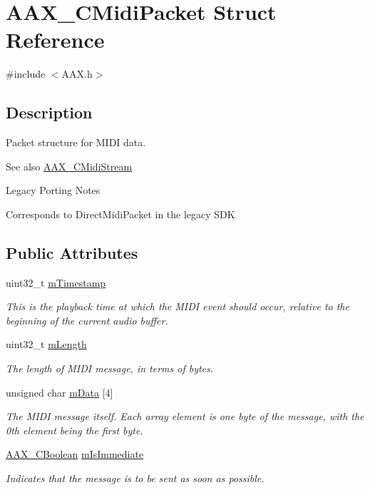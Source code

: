 \hypertarget{a01429}{}\section{A\+A\+X\+\_\+\+C\+Midi\+Packet Struct Reference}
\label{a01429}


{\ttfamily \#include $<$A\+A\+X.\+h$>$}



\subsection{Description}
Packet structure for M\+I\+DI data. 

\begin{DoxySeeAlso}{See also}
\mbox{\hyperlink{a01433}{A\+A\+X\+\_\+\+C\+Midi\+Stream}}
\end{DoxySeeAlso}
\begin{DoxyRefDesc}{Legacy Porting Notes}
\item[\mbox{\hyperlink{a00787__porting_notes000003}{Legacy Porting Notes}}]Corresponds to Direct\+Midi\+Packet in the legacy S\+DK \end{DoxyRefDesc}
\subsection*{Public Attributes}
\begin{DoxyCompactItemize}
\item 
uint32\+\_\+t \mbox{\hyperlink{a01429_a76df0e71968aa1416b93015ebf23ddc5}{m\+Timestamp}}
\begin{DoxyCompactList}\small\item\em This is the playback time at which the M\+I\+DI event should occur, relative to the beginning of the current audio buffer. \end{DoxyCompactList}\item 
uint32\+\_\+t \mbox{\hyperlink{a01429_aa0f16872a37737488aa42f1d9614d6a5}{m\+Length}}
\begin{DoxyCompactList}\small\item\em The length of M\+I\+DI message, in terms of bytes. \end{DoxyCompactList}\item 
unsigned char \mbox{\hyperlink{a01429_aac7229afc36006bc673eb219b18d8220}{m\+Data}} \mbox{[}4\mbox{]}
\begin{DoxyCompactList}\small\item\em The M\+I\+DI message itself. Each array element is one byte of the message, with the 0th element being the first byte. \end{DoxyCompactList}\item 
\mbox{\hyperlink{a00392_aa216506530f1d19a2965931ced2b274b}{A\+A\+X\+\_\+\+C\+Boolean}} \mbox{\hyperlink{a01429_ab6fce0aee8fb08695ac8a112b3c3e7fa}{m\+Is\+Immediate}}
\begin{DoxyCompactList}\small\item\em Indicates that the message is to be sent as soon as possible. \end{DoxyCompactList}\end{DoxyCompactItemize}


